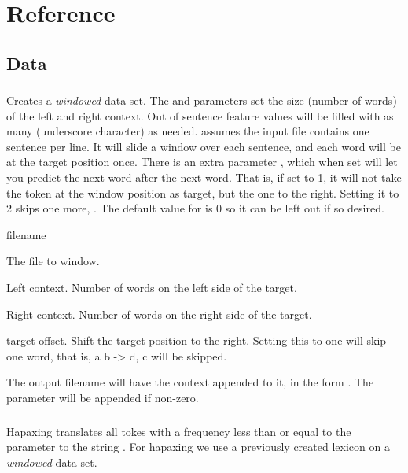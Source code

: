 \documentclass[a4paper,10pt,twoside]{report}
\begin{document}
\chapter{Reference}

\section{Data}

\subsection{}

Creates a \emph{windowed} data set. The  and 
parameters set the size (number of words) of the left and right
context. Out of sentence feature values will be filled with as many
\cmp{\_} (underscore character) as needed. \Wopr{} assumes the input
file contains one sentence per line. It will slide a window over each
sentence, and each word will be at the target position once. There is
an extra parameter , which when set will let you predict the
next word after the next word. That is, if set to \num{1}, it will not
take the token at the window position as target, but the one to the
right. Setting it to \num{2} skips one more, \etc{}. The default value
for  is 0 so it can be left out if so desired.

\begin{varlist}{filename}
\item[filename] The file to window.
\item[lc] Left context. Number of words on the left side of the target.
\item[rc] Right context. Number of words on the right side of the target.
\item[to] target offset. Shift the target position to the right. Setting this to
  one will skip one word, that is, a b -> d, c will be skipped.
\end{varlist}

The output filename will have the context appended to it, in the form
. The  parameter will be appended if non-zero.

\subsection{}

Hapaxing translates all tokes with a frequency less than or equal to
the  parameter to the string . For hapaxing we use
a previously created lexicon on a \emph{windowed} data set.
\end{document}
